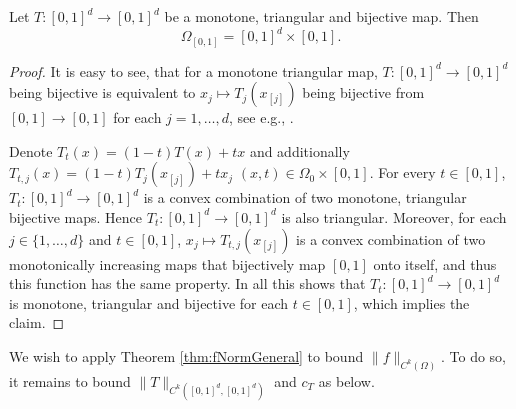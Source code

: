   \begin{proposition}\label{prop:cube}
    Let $T:[0,1]^d\to [0,1]^d$ be a monotone, triangular and bijective
    map.
    Then
    \begin{equation*}
      \Omega_{[0,1]}%
      = [0,1]^d\times [0,1].
    \end{equation*}
  \end{proposition}
  \begin{proof}
    It is easy to see, that for a monotone triangular map,
    $T:[0,1]^d\to [0,1]^d$ being bijective is equivalent to
    $x_j\mapsto T_j(x_{[j]})$ being bijective from $[0,1]\to [0,1]$
    for each $j=1,\dots,d$, see e.g., \cite[Lemma 3.1]{ZM2}.
    
    Denote $T_t(x)=(1-t)T(x)+tx$ and additionally
    $T_{t,j}(x)=(1-t)T_j(x_{[j]})+tx_j$
    $(x,t)\in\Omega_0\times [0,1]$.  For every $t\in [0,1]$,
    $T_t:[0,1]^d\to [0,1]^d$ is a convex combination of two monotone,
    triangular bijective maps. Hence $T_t:[0,1]^d\to [0,1]^d$ is also
    triangular. Moreover, for each $j\in\{1,\dots,d\}$ and
    $t\in [0,1]$, $x_j\mapsto T_{t,j}(x_{[j]})$ is a convex
    combination of two monotonically increasing maps that bijectively
    map $[0,1]$ onto itself, and thus this function has the same
    property. In all this shows that $T_t:[0,1]^d\to [0,1]^d$ is
    monotone, triangular and bijective for each $t\in [0,1]$, which
    implies the claim.
  \end{proof}

  We wish to apply Theorem \ref{thm:fNormGeneral} to bound
  $\|f\|_{C^k(\Omega)}$. To do so, it remains to bound
  $\|T\|_{C^k([0,1]^d, [0,1]^d)}$ and $c_T$ as below. 


